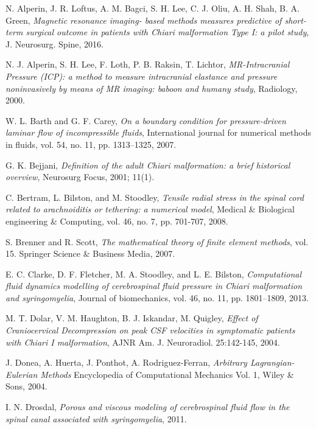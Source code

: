 \documentclass[a4paper,11pt,openright,twoside]{book}
\begin{document}
\begin{thebibliography}{100}

 N. Alperin, J. R. Loftus, A. M. Bagci, S. H. Lee, C. J. Oliu, A. H. Shah, B. A. Green, \emph{Magnetic resonance imaging- based methods measures predictive of short-term surgical outcome in patients with Chiari malformation Type I: a pilot study}, J. Neurosurg. Spine, 2016.

 N. J. Alperin, S. H. Lee, F. Loth, P. B. Raksin, T. Lichtor, \emph{MR-Intracranial Pressure (ICP): a method to measure intracranial elastance and pressure noninvasively by means of MR imaging: baboon and humany study}, Radiology, 2000.

 W. L. Barth and G. F. Carey, \emph{On a boundary condition for pressure-driven laminar flow of incompressible fluids}, International journal for numerical methods in fluids, vol. 54, no. 11, pp. 1313–1325, 2007.


 G. K. Bejjani, \emph{Definition of the adult Chiari malformation: a brief historical overview}, Neurosurg Focus, 2001; 11(1).

 C. Bertram, L. Bilston, and M. Stoodley, \emph{Tensile radial stress in the spinal cord related to arachnoiditis or tethering: a numerical model}, Medical \& Biological engineering \& Computing, vol. 46, no. 7, pp. 701-707, 2008.

 S. Brenner and R. Scott, \emph{The mathematical theory of finite element methods}, vol. 15. Springer Science \& Business Media, 2007.

 E. C. Clarke, D. F. Fletcher, M. A. Stoodley, and L. E. Bilston, \emph{Computational fluid dynamics modelling of cerebrospinal fluid pressure in Chiari malformation and syringomyelia}, Journal of biomechanics, vol. 46, no. 11, pp. 1801–1809,
2013.

 M. T. Dolar, V. M. Haughton, B. J. Iskandar, M. Quigley, \emph{Effect of Craniocervical Decompression on peak CSF velocities in symptomatic patients with Chiari I malformation}, AJNR Am. J. Neuroradiol. 25:142-145, 2004.

 J. Donea, A. Huerta, J. Ponthot, A. Rodriguez-Ferran, \emph{Arbitrary Lagrangian-Eulerian Methods} Encyclopedia of Computational Mechanics Vol. 1, Wiley \& Sons, 2004.

 I. N. Drosdal, \emph{Porous and viscous modeling of cerebrospinal fluid flow in the spinal canal associated with syringomyelia}, 2011.


\end{thebibliography}
\end{document}
